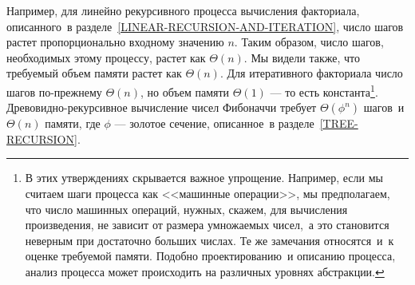 %
%  
Например, для линейно рекурсивного процесса вычисления
факториала, описанного~в разделе~\ref{LINEAR-RECURSION-AND-ITERATION}, число шагов
растет пропорционально входному значению $n$.  Таким образом, число
шагов, необходимых этому процессу, растет как
$\Theta(n)$.  Мы видели также, что%
%
%
требуемый объем памяти%
% 
растет как $\Theta(n)$.  Для итеративного факториала число
шагов по-прежнему $\Theta(n)$, но объем памяти
$\Theta(1)$ --- то есть константа\footnote{В этих утверждениях скрывается важное упрощение.
Например, если мы считаем шаги процесса как <<машинные операции>>, мы
предполагаем, что число машинных операций, нужных, скажем, 
для вычисления произведения, не зависит от размера
умножаемых чисел,~а это становится неверным при достаточно больших
числах.  Те же замечания относятся~и~к оценке требуемой памяти.
Подобно проектированию~и описанию процесса, анализ процесса может
происходить на различных уровнях абстракции.
}.
%
%
%
Древовидно-рекурсивное вычисление чисел Фибоначчи требует
$\Theta(\phi^n)$ шагов~и $\Theta(n)$ памяти, где 
$\phi$ --- золотое сечение, описанное~в разделе~\ref{TREE-RECURSION}.

